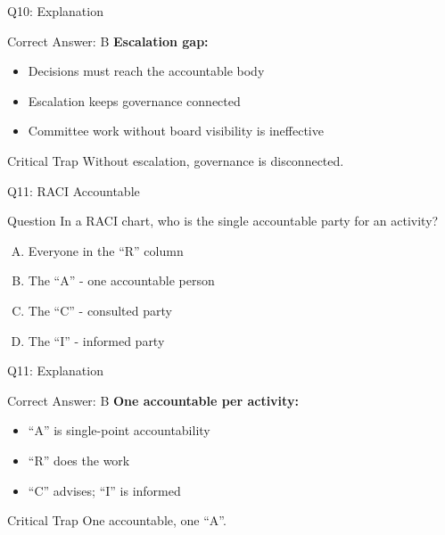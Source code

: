 \documentclass{beamer}
\begin{document}
	\begin{frame}{Q10: Explanation}
		\begin{block}{Correct Answer: B}
			\textbf{Escalation gap:}
			\begin{itemize}
				\item Decisions must reach the accountable body
				\item Escalation keeps governance connected
				\item Committee work without board visibility is ineffective
			\end{itemize}
		\end{block}
		\begin{alertblock}{Critical Trap}
			Without escalation, governance is disconnected.
		\end{alertblock}
	\end{frame}
	
	\begin{frame}{Q11: RACI Accountable}
		\begin{block}{Question}
			In a RACI chart, who is the single accountable party for an activity?
		\end{block}
		\begin{enumerate}[(A)]
			\item Everyone in the ``R'' column
			\item The ``A'' - one accountable person
			\item The ``C'' - consulted party
			\item The ``I'' - informed party
		\end{enumerate}
	\end{frame}
	
	\begin{frame}{Q11: Explanation}
		\begin{block}{Correct Answer: B}
			\textbf{One accountable per activity:}
			\begin{itemize}
				\item ``A'' is single-point accountability
				\item ``R'' does the work
				\item ``C'' advises; ``I'' is informed
			\end{itemize}
		\end{block}
		\begin{alertblock}{Critical Trap}
			One accountable, one ``A''.
		\end{alertblock}
	\end{frame}
	
\end{document}
